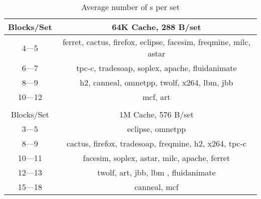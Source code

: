 \begin{table}[h]
  \centering
  \begin{tabular}{|c|c|}
  \hline 
    Blocks/Set & 64K Cache, 288 B/set \\
    \hline
    4---5  &  ferret, cactus, firefox, eclipse, facesim, freqmine, milc, astar\\
    6---7  &  tpc-c, tradesoap, soplex, apache, fluidanimate\\
    8---9  &  h2, canneal, omnetpp, twolf, x264, lbm, jbb \\
    10---12 & mcf, art \\
    \hline
    \multicolumn{2}{c}{} \\
    \hline
    Blocks/Set & 1M Cache, 576 B/set \\
    \hline
    3---5 & eclipse, omnetpp   \\
    8---9 & cactus, firefox, tradesoap, freqmine, h2, x264, tpc-c   \\
    10---11  & facesim, soplex, astar, milc, apache, ferret  \\
    12---13  & twolf, art, jbb, lbm , fluidanimate \\
    15---18 & canneal, mcf \\
    \hline
  \end{tabular}
  \caption[Amoeba Blocks per set]{Average number of \AB{}s per set}
  \label{table:blockcount}
\end{table}
